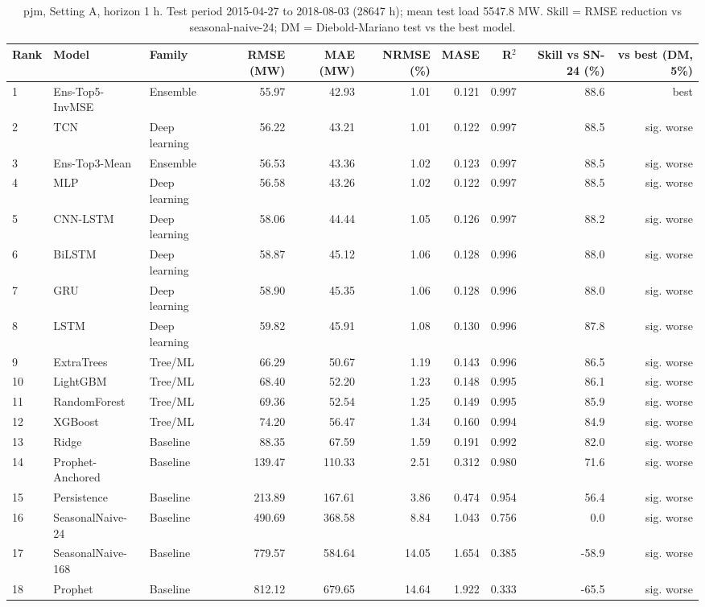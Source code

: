 \begin{table}[ht]
\centering
\small
\caption{pjm, Setting A, horizon 1 h. Test period 2015-04-27 to 2018-08-03 (28647 h); mean test load 5547.8 MW. Skill = RMSE reduction vs seasonal-naive-24; DM = Diebold-Mariano test vs the best model.}
\label{tab:pjm_A_H1_full}
\begin{tabular}{lllrrrrrrr}
\toprule
Rank & Model & Family & RMSE (MW) & MAE (MW) & NRMSE (\%) & MASE & R$^2$ & Skill vs SN-24 (\%) & vs best (DM, 5\%) \\
\midrule
1 & Ens-Top5-InvMSE & Ensemble & 55.97 & 42.93 & 1.01 & 0.121 & 0.997 & 88.6 & best \\
2 & TCN & Deep learning & 56.22 & 43.21 & 1.01 & 0.122 & 0.997 & 88.5 & sig. worse \\
3 & Ens-Top3-Mean & Ensemble & 56.53 & 43.36 & 1.02 & 0.123 & 0.997 & 88.5 & sig. worse \\
4 & MLP & Deep learning & 56.58 & 43.26 & 1.02 & 0.122 & 0.997 & 88.5 & sig. worse \\
5 & CNN-LSTM & Deep learning & 58.06 & 44.44 & 1.05 & 0.126 & 0.997 & 88.2 & sig. worse \\
6 & BiLSTM & Deep learning & 58.87 & 45.12 & 1.06 & 0.128 & 0.996 & 88.0 & sig. worse \\
7 & GRU & Deep learning & 58.90 & 45.35 & 1.06 & 0.128 & 0.996 & 88.0 & sig. worse \\
8 & LSTM & Deep learning & 59.82 & 45.91 & 1.08 & 0.130 & 0.996 & 87.8 & sig. worse \\
9 & ExtraTrees & Tree/ML & 66.29 & 50.67 & 1.19 & 0.143 & 0.996 & 86.5 & sig. worse \\
10 & LightGBM & Tree/ML & 68.40 & 52.20 & 1.23 & 0.148 & 0.995 & 86.1 & sig. worse \\
11 & RandomForest & Tree/ML & 69.36 & 52.54 & 1.25 & 0.149 & 0.995 & 85.9 & sig. worse \\
12 & XGBoost & Tree/ML & 74.20 & 56.47 & 1.34 & 0.160 & 0.994 & 84.9 & sig. worse \\
13 & Ridge & Baseline & 88.35 & 67.59 & 1.59 & 0.191 & 0.992 & 82.0 & sig. worse \\
14 & Prophet-Anchored & Baseline & 139.47 & 110.33 & 2.51 & 0.312 & 0.980 & 71.6 & sig. worse \\
15 & Persistence & Baseline & 213.89 & 167.61 & 3.86 & 0.474 & 0.954 & 56.4 & sig. worse \\
16 & SeasonalNaive-24 & Baseline & 490.69 & 368.58 & 8.84 & 1.043 & 0.756 & 0.0 & sig. worse \\
17 & SeasonalNaive-168 & Baseline & 779.57 & 584.64 & 14.05 & 1.654 & 0.385 & -58.9 & sig. worse \\
18 & Prophet & Baseline & 812.12 & 679.65 & 14.64 & 1.922 & 0.333 & -65.5 & sig. worse \\
\bottomrule
\end{tabular}
\end{table}